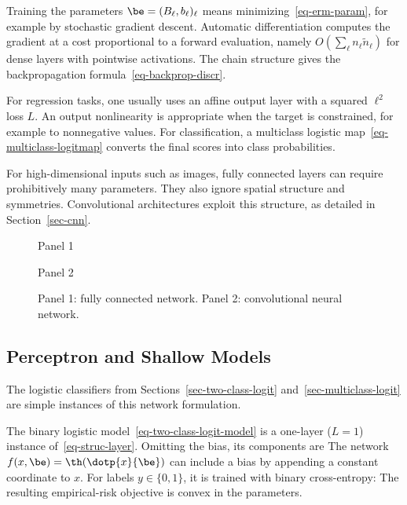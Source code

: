 Training the parameters $\be = (B_\ell,b_\ell)_\ell$ means minimizing~\eqref{eq-erm-param}, for example by stochastic gradient descent. Automatic differentiation computes the gradient at a cost proportional to a forward evaluation, namely $O(\sum_\ell n_\ell\tilde n_\ell)$ for dense layers with pointwise activations. The chain structure gives the backpropagation formula~\eqref{eq-backprop-discr}.

For regression tasks, one usually uses an affine output layer with a squared $\ell^2$ loss $L$. An output nonlinearity is appropriate when the target is constrained, for example to nonnegative values.
%
For classification, a multiclass logistic map~\eqref{eq-multiclass-logitmap} converts the final scores into class probabilities.

For high-dimensional inputs such as images, fully connected layers can require prohibitively many parameters. They also ignore spatial structure and symmetries. Convolutional architectures exploit this structure, as detailed in Section~\ref{sec-cnn}.


\begin{figure}[tbp]
\centering
{\small\sffamily\color{BookMuted}Panel 1\par}\smallskip
{}
\par\medskip
{\small\sffamily\color{BookMuted}Panel 2\par}\smallskip
{}
\caption{Panel 1: fully connected network.
Panel 2: convolutional neural network.}
\label{fig-deep-fc-cnn}
\end{figure}


\subsection{Perceptron and Shallow Models}

The logistic classifiers from Sections~\ref{sec-two-class-logit} and~\ref{sec-multiclass-logit} are simple instances of this network formulation.

The binary logistic model~\eqref{eq-two-class-logit-model} is a one-layer ($L=1$) instance of~\eqref{eq-struc-layer}. Omitting the bias, its components are
The network $f(x,\be) = \th(\dotp{x}{\be})$ can include a bias by appending a constant coordinate to $x$. For labels $y \in \{0,1\}$, it is trained with binary cross-entropy:
The resulting empirical-risk objective is convex in the parameters.

